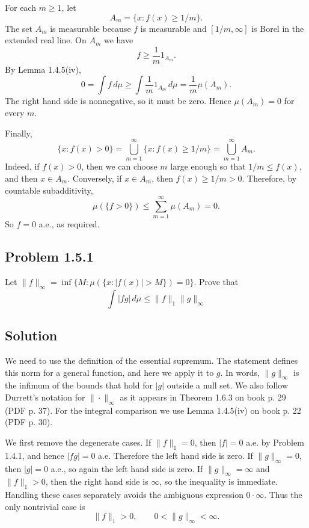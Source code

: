 \documentclass[a4paper,12pt,openany]{article}
\theoremstyle{plain}
\theoremstyle{definition}
\begin{document}
\medskip

For each $m\ge 1$, let
\[
A_m=\{x:f(x)\ge 1/m\}.
\]
The set $A_m$ is measurable because $f$ is measurable and $[1/m,\infty]$ is Borel in the extended real line.
On $A_m$ we have
\[
f\ge \frac{1}{m}1_{A_m}.
\]
By Lemma 1.4.5(iv),
\[
0
=
\int f\,d\mu
\ge
\int \frac{1}{m}1_{A_m}\,d\mu
=
\frac{1}{m}\mu(A_m).
\]
The right hand side is nonnegative, so it must be zero.
Hence $\mu(A_m)=0$ for every $m$.

\medskip

Finally,
\[
\{x:f(x)>0\}
=
\bigcup_{m=1}^{\infty}\{x:f(x)\ge 1/m\}
=
\bigcup_{m=1}^{\infty}A_m.
\]
Indeed, if $f(x)>0$, then we can choose $m$ large enough so that $1/m\le f(x)$, and then $x\in A_m$. Conversely, if $x\in A_m$, then $f(x)\ge 1/m>0$.
Therefore, by countable subadditivity,
\[
\mu(\{f>0\})
\le
\sum_{m=1}^{\infty}\mu(A_m)
=0.
\]
So $f=0$ a.e., as required.

\subsection*{Problem 1.5.1}

Let $\|f\|_\infty = \inf\{M : \mu(\{x : |f(x)| > M\}) = 0\}$. Prove that
\[
\int |f g|\,d\mu \le \|f\|_1 \|g\|_\infty
\]

\subsection*{Solution}

We need to use the definition of the essential supremum. The statement defines this norm for a general function, and here we apply it to $g$. In words, $\|g\|_\infty$ is the infimum of the bounds that hold for $|g|$ outside a null set. We also follow Durrett's notation for $\|\cdot\|_\infty$ as it appears in Theorem 1.6.3 on book p. 29 (PDF p. 37). For the integral comparison we use Lemma 1.4.5(iv) on book p. 22 (PDF p. 30).

\medskip

We first remove the degenerate cases. If $\|f\|_1=0$, then $|f|=0$ a.e. by Problem 1.4.1, and hence $|fg|=0$ a.e. Therefore the left hand side is zero. If $\|g\|_\infty=0$, then $|g|=0$ a.e., so again the left hand side is zero. If $\|g\|_\infty=\infty$ and $\|f\|_1>0$, then the right hand side is $\infty$, so the inequality is immediate. Handling these cases separately avoids the ambiguous expression $0\cdot\infty$. Thus the only nontrivial case is
\[
\|f\|_1>0,
\qquad
0<\|g\|_\infty<\infty.
\]
\end{document}
